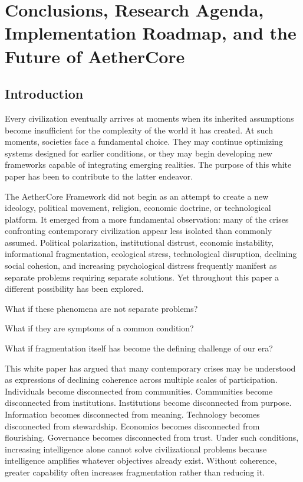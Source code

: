 \documentclass[12pt]{article}
\begin{document}
\section{Conclusions, Research Agenda, Implementation Roadmap, and the Future of AetherCore}

\subsection{Introduction}

Every civilization eventually arrives at moments when its inherited assumptions become insufficient for the complexity of the world it has created. At such moments, societies face a fundamental choice. They may continue optimizing systems designed for earlier conditions, or they may begin developing new frameworks capable of integrating emerging realities. The purpose of this white paper has been to contribute to the latter endeavor.

The AetherCore Framework did not begin as an attempt to create a new ideology, political movement, religion, economic doctrine, or technological platform. It emerged from a more fundamental observation: many of the crises confronting contemporary civilization appear less isolated than commonly assumed. Political polarization, institutional distrust, economic instability, informational fragmentation, ecological stress, technological disruption, declining social cohesion, and increasing psychological distress frequently manifest as separate problems requiring separate solutions. Yet throughout this paper a different possibility has been explored.

What if these phenomena are not separate problems?

What if they are symptoms of a common condition?

What if fragmentation itself has become the defining challenge of our era?

This white paper has argued that many contemporary crises may be understood as expressions of declining coherence across multiple scales of participation. Individuals become disconnected from communities. Communities become disconnected from institutions. Institutions become disconnected from purpose. Information becomes disconnected from meaning. Technology becomes disconnected from stewardship. Economics becomes disconnected from flourishing. Governance becomes disconnected from trust. Under such conditions, increasing intelligence alone cannot solve civilizational problems because intelligence amplifies whatever objectives already exist. Without coherence, greater capability often increases fragmentation rather than reducing it.
\end{document}

